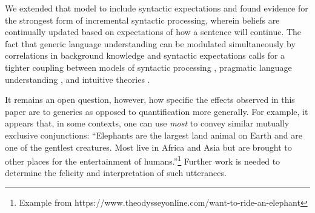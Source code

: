 \documentclass[10pt,letterpaper]{article}
\begin{document}
We extended that model to include syntactic expectations and found evidence for the strongest form of incremental syntactic processing, wherein beliefs are continually updated based on expectations of how a sentence will continue. 
The fact that generic language understanding can be modulated simultaneously by correlations in background knowledge and syntactic expectations calls for a tighter coupling between models of syntactic processing \cite{Levy2008}, pragmatic language understanding \cite{Goodman2016}, and intuitive theories \cite{tenenbaum2011grow}. 

It remains an open question, however, how specific the effects observed in this paper are to generics as opposed to quantification more generally. 
For example, it appears that, in some contexts, one can use \emph{most} to convey similar mutually exclusive conjunctions: ``Elephants are the largest land animal on Earth and are one of the gentlest creatures. Most live in Africa and Asia but are brought to other places for the entertainment of humans.''\footnote{
Example from https://www.theodysseyonline.com/want-to-ride-an-elephant
}
Further work is needed to determine the felicity and interpretation of such utterances.





\end{document}
